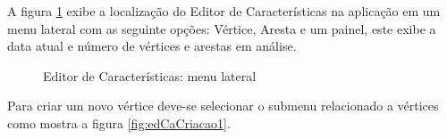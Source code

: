 A figura \ref{fig:edCaMenu} exibe a localização do Editor de Características na aplicação em um menu lateral com as seguinte opções: Vértice, Aresta e um painel, este exibe a data atual e número de vértices e arestas em análise.
\begin{figure}[!ht]
	\centering	
	\caption{\label{fig:edCaMenu} Editor de Características: menu lateral}
\end{figure}
\FloatBarrier

Para criar um novo vértice deve-se selecionar o submenu relacionado a vértices como mostra a figura \ref{fig:edCaCriacao1}.
\begin{figure}[!ht]
	\centering	
\end{figure}
\FloatBarrier

